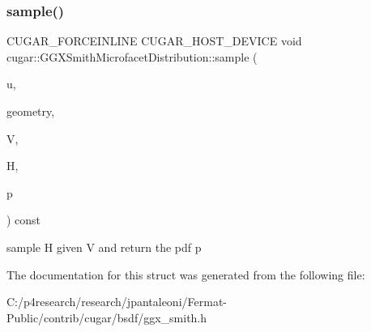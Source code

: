 \subsubsection{\texorpdfstring{sample()}{sample()}}
{\footnotesize\ttfamily C\+U\+G\+A\+R\+\_\+\+F\+O\+R\+C\+E\+I\+N\+L\+I\+NE C\+U\+G\+A\+R\+\_\+\+H\+O\+S\+T\+\_\+\+D\+E\+V\+I\+CE void cugar\+::\+G\+G\+X\+Smith\+Microfacet\+Distribution\+::sample (\begin{DoxyParamCaption}\item[{const \hyperlink{structcugar_1_1_vector}{Vector3f}}]{u,  }\item[{const \hyperlink{structcugar_1_1_differential_geometry}{Differential\+Geometry} \&}]{geometry,  }\item[{const \hyperlink{structcugar_1_1_vector}{Vector3f}}]{V,  }\item[{\hyperlink{structcugar_1_1_vector}{Vector3f} \&}]{H,  }\item[{float \&}]{p }\end{DoxyParamCaption}) const\hspace{0.3cm}{\ttfamily [inline]}}

sample H given V and return the pdf p 

The documentation for this struct was generated from the following file\+:\begin{DoxyCompactItemize}
\item 
C\+:/p4research/research/jpantaleoni/\+Fermat-\/\+Public/contrib/cugar/bsdf/ggx\+\_\+smith.\+h\end{DoxyCompactItemize}
